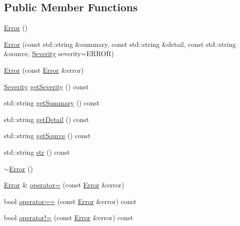 \subsection*{Public Member Functions}
\begin{DoxyCompactItemize}
\item 
\hyperlink{classBUSBOY_1_1Error_a588193adec1a3a5ce26f73856cd2753e}{Error} ()
\item 
\hyperlink{classBUSBOY_1_1Error_a941ea77fb5671d771b72f5f1cdb4af09}{Error} (const std::string \&summary, const std::string \&detail, const std::string \&source, \hyperlink{classBUSBOY_1_1Error_a999444a8876433731c3d2e824d4c23e4}{Severity} severity=ERROR)
\item 
\hyperlink{classBUSBOY_1_1Error_a2ed3c49cd05ad39e96353c09a8b2cc00}{Error} (const \hyperlink{classBUSBOY_1_1Error}{Error} \&error)
\item 
\hyperlink{classBUSBOY_1_1Error_a999444a8876433731c3d2e824d4c23e4}{Severity} \hyperlink{classBUSBOY_1_1Error_a97f58492e55ae069c3dfa8f42156715b}{getSeverity} () const 
\item 
std::string \hyperlink{classBUSBOY_1_1Error_ae726626acd5ac3bcdcbfcc303d8e79bd}{getSummary} () const 
\item 
std::string \hyperlink{classBUSBOY_1_1Error_a9f8d682aa4bd51f2799bafa555f8bed5}{getDetail} () const 
\item 
std::string \hyperlink{classBUSBOY_1_1Error_a5fcae27aef82c14a142dfaf50a34fbc7}{getSource} () const 
\item 
std::string \hyperlink{classBUSBOY_1_1Error_a9adf9f03fe27d57c0aa25fa43c126421}{str} () const 
\item 
\hyperlink{classBUSBOY_1_1Error_a8ac9fe86b42f46a9fd90b33cb27e4a8d}{$\sim$Error} ()
\item 
\hyperlink{classBUSBOY_1_1Error}{Error} \& \hyperlink{classBUSBOY_1_1Error_ad7e628677a6f298b976e6842730045d7}{operator=} (const \hyperlink{classBUSBOY_1_1Error}{Error} \&error)
\item 
bool \hyperlink{classBUSBOY_1_1Error_a7851c34d94750df8fe219b93a9df1c20}{operator==} (const \hyperlink{classBUSBOY_1_1Error}{Error} \&error) const 
\item 
bool \hyperlink{classBUSBOY_1_1Error_a3e803e02feaf561cab19e946390417a4}{operator!=} (const \hyperlink{classBUSBOY_1_1Error}{Error} \&error) const 
\end{DoxyCompactItemize}
